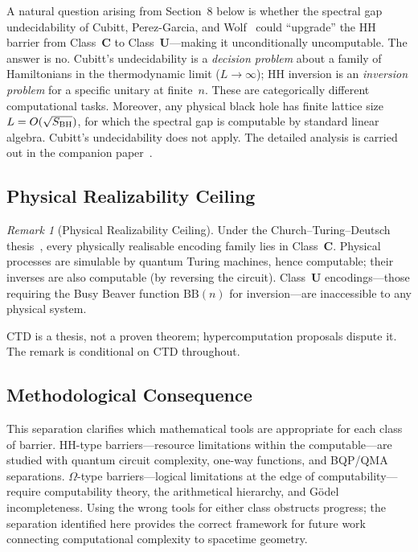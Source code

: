 \documentclass[12pt,a4paper]{article}
\theoremstyle{remark}
\newtheorem{remark}{Remark}
\begin{document}
A natural question arising from Section~8 below is whether the spectral gap undecidability of Cubitt, Perez-Garcia, and Wolf~\cite{Cubitt2015} could ``upgrade'' the HH barrier from Class~$\mathbf{C}$ to Class~$\mathbf{U}$---making it unconditionally uncomputable.
The answer is no.
Cubitt's undecidability is a \emph{decision problem} about a family of Hamiltonians in the thermodynamic limit ($L\to\infty$); HH inversion is an \emph{inversion problem} for a specific unitary at finite~$n$.
These are categorically different computational tasks.
Moreover, any physical black hole has finite lattice size $L = O(\sqrt{S_{\rm BH}})$, for which the spectral gap is computable by standard linear algebra.
Cubitt's undecidability does not apply.
The detailed analysis is carried out in the companion paper~\cite{ChengPaperC2026}.

\subsection{Physical Realizability Ceiling}

\begin{remark}[Physical Realizability Ceiling]
Under the Church--Turing--Deutsch thesis~\cite{Deutsch1985}, every physically realisable encoding family lies in Class~$\mathbf{C}$.
Physical processes are simulable by quantum Turing machines, hence computable; their inverses are also computable (by reversing the circuit).
Class~$\mathbf{U}$ encodings---those requiring the Busy Beaver function $\mathrm{BB}(n)$ for inversion---are inaccessible to any physical system.
\end{remark}

CTD is a thesis, not a proven theorem; hypercomputation proposals dispute it.
The remark is conditional on CTD throughout.

\subsection{Methodological Consequence}

This separation clarifies which mathematical tools are appropriate for each class of barrier.
HH-type barriers---resource limitations within the computable---are studied with quantum circuit complexity, one-way functions, and BQP/QMA separations.
$\Omega$-type barriers---logical limitations at the edge of computability---require computability theory, the arithmetical hierarchy, and G\"odel incompleteness.
Using the wrong tools for either class obstructs progress; the separation identified here provides the correct framework for future work connecting computational complexity to spacetime geometry.
\end{document}

